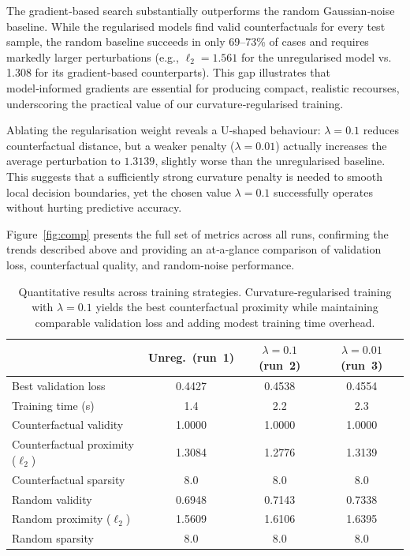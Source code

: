 \documentclass[11pt,a4paper]{article}
\begin{document}
The gradient‑based search substantially outperforms the random Gaussian‑noise baseline. While the regularised models find valid counterfactuals for every test sample, the random baseline succeeds in only 69–73\% of cases and requires markedly larger perturbations (e.g., \(\ell_2 = 1.561\) for the unregularised model vs. 1.308 for its gradient‑based counterparts). This gap illustrates that model‑informed gradients are essential for producing compact, realistic recourses, underscoring the practical value of our curvature‑regularised training.

Ablating the regularisation weight reveals a U‑shaped behaviour: \(\lambda = 0.1\) reduces counterfactual distance, but a weaker penalty (\(\lambda = 0.01\)) actually increases the average perturbation to \(1.3139\), slightly worse than the unregularised baseline. This suggests that a sufficiently strong curvature penalty is needed to smooth local decision boundaries, yet the chosen value \(\lambda = 0.1\) successfully operates without hurting predictive accuracy.

Figure~\ref{fig:comp} presents the full set of metrics across all runs, confirming the trends described above and providing an at‑a‑glance comparison of validation loss, counterfactual quality, and random‑noise performance.

\begin{table}[h]
\centering
\caption{Quantitative results across training strategies. Curvature‑regularised training with $\lambda=0.1$ yields the best counterfactual proximity while maintaining comparable validation loss and adding modest training time overhead.}
\label{tab:results}
\small
\begin{tabular}{lccc}
\toprule
& \textbf{Unreg.\ (run~1)} & \textbf{$\lambda=0.1$ (run~2)} & \textbf{$\lambda=0.01$ (run~3)} \\
\midrule
Best validation loss & 0.4427 & 0.4538 & 0.4554 \\
Training time (s) & 1.4 & 2.2 & 2.3 \\
\addlinespace
Counterfactual validity & 1.0000 & 1.0000 & 1.0000 \\
Counterfactual proximity ($\ell_2$) & 1.3084 & 1.2776 & 1.3139 \\
Counterfactual sparsity & 8.0 & 8.0 & 8.0 \\
Random validity & 0.6948 & 0.7143 & 0.7338 \\
Random proximity ($\ell_2$) & 1.5609 & 1.6106 & 1.6395 \\
Random sparsity & 8.0 & 8.0 & 8.0 \\
\bottomrule
\end{tabular}
\end{table}
\end{document}
